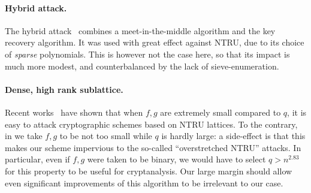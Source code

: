 %

\paragraph{Hybrid attack.} The hybrid attack~\cite{C:HowgraveGraham07} combines a meet-in-the-middle algorithm and the key recovery algorithm.
It was used with great effect against NTRU, due to its choice of {\em sparse} polynomials.
This is however not the case here, so that its impact is much more modest, and counterbalanced by the lack of sieve-enumeration.

\paragraph{Dense, high rank sublattice.}
Recent works~\cite{C:AlbBaiDuc16,EPRINT:CheJeoLee16,EC:KirFou17} have shown that when $f,g$ are extremely small compared to $q$, it is easy to attack cryptographic schemes based on NTRU lattices. To the contrary, in \falcon we take $f,g$ to be not too small while $q$ is hardly large: a side-effect is that this makes our scheme impervious to the so-called ``overstretched NTRU'' attacks.
In particular, even if $f,g$ were taken to be binary, we would have to select $q>n^{2.83}$ for this property to be useful for cryptanalysis.
Our large margin should allow even significant improvements of this algorithm to be irrelevant to our case.

